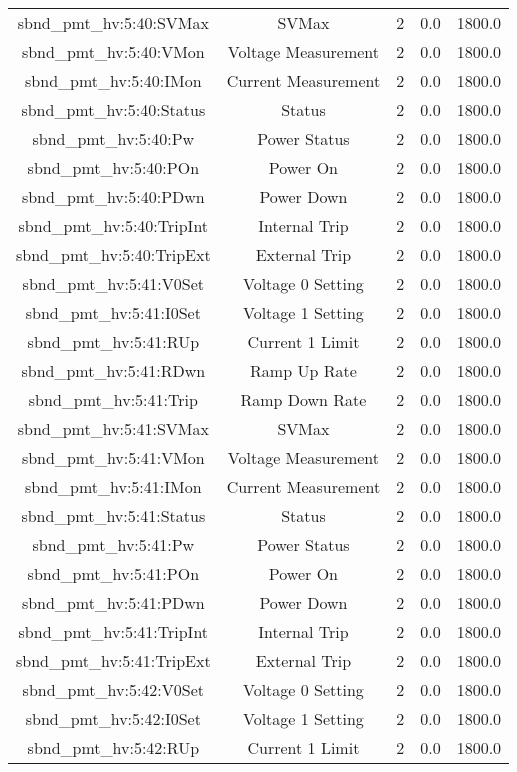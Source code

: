 \begin{table}[ptb]
\begin{tabular}{c | c c c c}
sbnd_pmt_hv:5:40:SVMax & SVMax & 2 & 0.0 & 1800.0\\ 
sbnd_pmt_hv:5:40:VMon & Voltage Measurement & 2 & 0.0 & 1800.0\\ 
sbnd_pmt_hv:5:40:IMon & Current Measurement & 2 & 0.0 & 1800.0\\ 
sbnd_pmt_hv:5:40:Status & Status & 2 & 0.0 & 1800.0\\ 
sbnd_pmt_hv:5:40:Pw & Power Status & 2 & 0.0 & 1800.0\\ 
sbnd_pmt_hv:5:40:POn & Power On & 2 & 0.0 & 1800.0\\ 
sbnd_pmt_hv:5:40:PDwn & Power Down & 2 & 0.0 & 1800.0\\ 
sbnd_pmt_hv:5:40:TripInt & Internal Trip & 2 & 0.0 & 1800.0\\ 
sbnd_pmt_hv:5:40:TripExt & External Trip & 2 & 0.0 & 1800.0\\ 
sbnd_pmt_hv:5:41:V0Set & Voltage 0 Setting & 2 & 0.0 & 1800.0\\ 
sbnd_pmt_hv:5:41:I0Set & Voltage 1 Setting & 2 & 0.0 & 1800.0\\ 
sbnd_pmt_hv:5:41:RUp & Current 1 Limit & 2 & 0.0 & 1800.0\\ 
sbnd_pmt_hv:5:41:RDwn & Ramp Up Rate & 2 & 0.0 & 1800.0\\ 
sbnd_pmt_hv:5:41:Trip & Ramp Down Rate & 2 & 0.0 & 1800.0\\ 
sbnd_pmt_hv:5:41:SVMax & SVMax & 2 & 0.0 & 1800.0\\ 
sbnd_pmt_hv:5:41:VMon & Voltage Measurement & 2 & 0.0 & 1800.0\\ 
sbnd_pmt_hv:5:41:IMon & Current Measurement & 2 & 0.0 & 1800.0\\ 
sbnd_pmt_hv:5:41:Status & Status & 2 & 0.0 & 1800.0\\ 
sbnd_pmt_hv:5:41:Pw & Power Status & 2 & 0.0 & 1800.0\\ 
sbnd_pmt_hv:5:41:POn & Power On & 2 & 0.0 & 1800.0\\ 
sbnd_pmt_hv:5:41:PDwn & Power Down & 2 & 0.0 & 1800.0\\ 
sbnd_pmt_hv:5:41:TripInt & Internal Trip & 2 & 0.0 & 1800.0\\ 
sbnd_pmt_hv:5:41:TripExt & External Trip & 2 & 0.0 & 1800.0\\ 
sbnd_pmt_hv:5:42:V0Set & Voltage 0 Setting & 2 & 0.0 & 1800.0\\ 
sbnd_pmt_hv:5:42:I0Set & Voltage 1 Setting & 2 & 0.0 & 1800.0\\ 
sbnd_pmt_hv:5:42:RUp & Current 1 Limit & 2 & 0.0 & 1800.0\\ 

\end{tabular}
\end{table}
